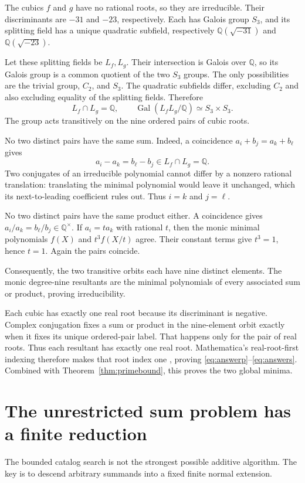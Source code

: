 \documentclass[11pt,a4paper]{article}
\newcommand{\Q}{\mathbb Q}
\newcommand{\Gal}{\operatorname{Gal}}
\theoremstyle{definition}
\theoremstyle{remark}
\begin{document}
The cubics $f$ and $g$ have no rational roots, so they are irreducible. Their discriminants are $-31$ and $-23$, respectively. Each has Galois group $S_3$, and its splitting field has a unique quadratic subfield, respectively $\Q(\sqrt{-31})$ and $\Q(\sqrt{-23})$.

Let these splitting fields be $L_f,L_g$. Their intersection is Galois over $\Q$, so its Galois group is a common quotient of the two $S_3$ groups. The only possibilities are the trivial group, $C_2$, and $S_3$. The quadratic subfields differ, excluding $C_2$ and also excluding equality of the splitting fields. Therefore
\[
 L_f\cap L_g=\Q,\qquad
 \Gal(L_fL_g/\Q)\simeq S_3\times S_3.
\]
The group acts transitively on the nine ordered pairs of cubic roots.

No two distinct pairs have the same sum. Indeed, a coincidence
$a_i+b_j=a_k+b_\ell$ gives
\[
 a_i-a_k=b_\ell-b_j\in L_f\cap L_g=\Q.
\]
Two conjugates of an irreducible polynomial cannot differ by a nonzero rational translation: translating the minimal polynomial would leave it unchanged, which its next-to-leading coefficient rules out. Thus $i=k$ and $j=\ell$.

No two distinct pairs have the same product either. A coincidence gives
$a_i/a_k=b_\ell/b_j\in\Q^\times$. If $a_i=t a_k$ with rational $t$, then the monic minimal polynomials $f(X)$ and $t^3 f(X/t)$ agree. Their constant terms give $t^3=1$, hence $t=1$. Again the pairs coincide.

Consequently, the two transitive orbits each have nine distinct elements. The monic degree-nine resultants are the minimal polynomials of every associated sum or product, proving irreducibility.

Each cubic has exactly one real root because its discriminant is negative. Complex conjugation fixes a sum or product in the nine-element orbit exactly when it fixes its unique ordered-pair label. That happens only for the pair of real roots. Thus each resultant has exactly one real root. Mathematica's real-root-first indexing therefore makes that root index one \cite{root}, proving \eqref{eq:answerp}--\eqref{eq:answers}. Combined with Theorem~\ref{thm:primebound}, this proves the two global minima.

\section{The unrestricted sum problem has a finite reduction}
\label{sec:additive}
The bounded catalog search is not the strongest possible additive algorithm. The key is to descend arbitrary summands into a fixed finite normal extension.
\end{document}
